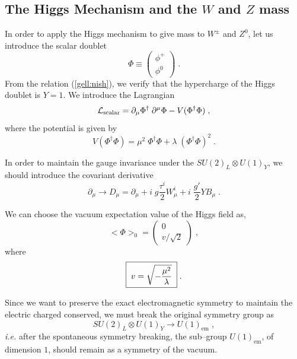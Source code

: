 \documentclass[12pt]{report}
\def\text#1{{\scriptstyle\mathrm{#1}}}
\newcommand{\lag}{{\cal L}}
\newcommand{\del}{\partial}
\newcommand{\ba}{\begin{array}}
\newcommand{\ea}{\end{array}}
\begin{document}

\subsection{The Higgs Mechanism and the $W$ and $Z$ mass} \indent

In order to apply the Higgs mechanism to give mass to $W^\pm$ and
$Z^0$, let us introduce the scalar doublet
\begin{equation}
\Phi \equiv 	\left( \ba{c}
	      		\phi^+\\
	      		\phi^0
              \ea \right) \; .
\label{phi}
\end{equation}
From the relation (\ref{gell:nish}), we verify that the hypercharge of
the Higgs doublet is $Y = 1$. We introduce the Lagrangian
\[
\lag_{\text{scalar}} = \del_\mu \Phi^\dagger \; \del^\mu \Phi -
V(\Phi^\dagger\Phi) \; ,
\]
where the potential is given by
\begin{equation}
V(\Phi^\dagger\Phi) = \mu^2 \; \Phi^\dagger\Phi + 
\lambda \; (\Phi^\dagger\Phi)^2 \; .
\label{hig:pot}
\end{equation}

In order to maintain the gauge invariance under the $SU(2)_L \otimes
U(1)_Y$, we should introduce the covariant derivative 
\[
\del_\mu \to D_\mu = \del_\mu + i \; g \frac{\tau^i}{2} W^i_\mu 
+ i \; \frac{g'}{2} Y B_\mu \; .
\]

We can choose the {vacuum expectation value} of the Higgs field as,
\[
<\Phi>_0 = \left( \ba{c}
	      		0\\
	      		v/\sqrt{2}
              \ea \right) \; ,
\]
where
\begin{equation}
\fbox{$ \; \displaystyle{
v = \sqrt{ - \frac{\mu^2}{\lambda} }} \; $} \; .
\label{v}
\end{equation}

Since we want to preserve the exact electromagnetic symmetry to
maintain the electric charged conserved, we must break the original
symmetry group as
\[
SU(2)_L \otimes U(1)_Y  \to U(1)_{\text{em}} \; ,
\]
{\it i.e.} after the spontaneous symmetry breaking, the sub--group $
U(1)_{\text{em}}$, of dimension $1$, should remain as a symmetry of
the vacuum.
\end{document}
